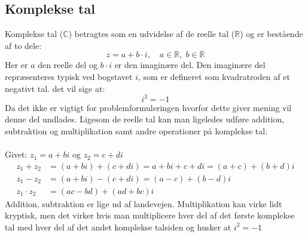 \documentclass{article}
\begin{document}
\subsection{Komplekse tal}
Komplekse tal ($\mathbb{C}$) betragtes som en udvidelse af de reelle tal ($\mathbb{R}$) og er bestående af to dele:
$$
z=a+b\cdot i,\quad a\in \mathbb {R} ,\;b\in \mathbb {R}
$$
Her er $a$ den reelle del og $b\cdot i$ er den imaginære del. Den imaginære del repræsenteres typisk ved bogstavet $i$, som er defineret som kvadratroden af et negativt tal. det vil sige at: 
$$
i^2=-1
$$
Da det ikke er vigtigt for problemformuleringen hvorfor dette giver mening vil denne del undlades. Ligesom de reelle tal kan man ligeledes udføre addition, subtraktion og multiplikation samt andre operationer på komplekse tal:\\\\
Givet: $z_1=a+bi$ og $z_2=c+di$
\begin{align*} 
     z_1+z_2&=(a+bi)+(c+di)=a+bi+c+di=(a+c)+(b+d)i\\
     z_1-z_2&=(a+bi)-(c+di)=(a-c)+(b-d)i\\
z_1\cdot z_2&=(ac - bd) + (ad + bc)i
\end{align*}
Addition, subtraktion er lige ud af landevejen. Multiplikation kan virke lidt kryptisk, men det virker hvis man multiplicere hver del af det første komplekse tal med hver del af det andet komplekse talsiden og husker at $i^2=-1$ \parencite{Cuemath}
\end{document}
